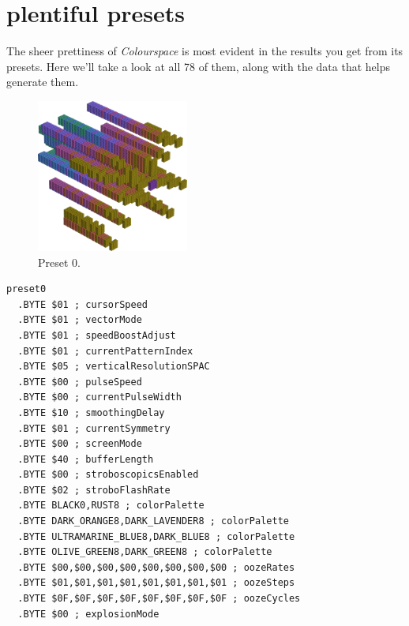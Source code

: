 \chapter{plentiful presets} 
\label{sec:colourspace_presets}
\lstset{style=6502Style}
The sheer prettiness of \textit{Colourspace} is most evident in the results you get from its
presets. Here we'll take a look at all 78 of them, along with the data that helps generate them.
\clearpage
\begin{minipage}[b]{0.48\linewidth}
\begin{figure}[H]                                                          
  \centering                                                             
  \begin{adjustbox}{width=5cm,center}                                   
  \includegraphics[width=5cm]{src/colorspace_presets/preset0-45.png}%
  \end{adjustbox}                                                        
\caption*{Preset 0.}                                           
\end{figure}                                                               
\end{minipage}
\hspace{0.1cm}
\begin{minipage}[b]{0.48\linewidth}                            
\begin{lstlisting}[basicstyle=\ttfamily\tiny]
preset0
  .BYTE $01 ; cursorSpeed
  .BYTE $01 ; vectorMode
  .BYTE $01 ; speedBoostAdjust
  .BYTE $01 ; currentPatternIndex
  .BYTE $05 ; verticalResolutionSPAC
  .BYTE $00 ; pulseSpeed
  .BYTE $00 ; currentPulseWidth
  .BYTE $10 ; smoothingDelay
  .BYTE $01 ; currentSymmetry
  .BYTE $00 ; screenMode
  .BYTE $40 ; bufferLength
  .BYTE $00 ; stroboscopicsEnabled
  .BYTE $02 ; stroboFlashRate
  .BYTE BLACK0,RUST8 ; colorPalette
  .BYTE DARK_ORANGE8,DARK_LAVENDER8 ; colorPalette
  .BYTE ULTRAMARINE_BLUE8,DARK_BLUE8 ; colorPalette
  .BYTE OLIVE_GREEN8,DARK_GREEN8 ; colorPalette
  .BYTE $00,$00,$00,$00,$00,$00,$00,$00 ; oozeRates
  .BYTE $01,$01,$01,$01,$01,$01,$01,$01 ; oozeSteps
  .BYTE $0F,$0F,$0F,$0F,$0F,$0F,$0F,$0F ; oozeCycles
  .BYTE $00 ; explosionMode
\end{lstlisting}
\end{minipage}

